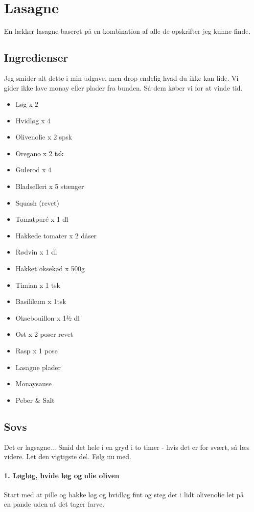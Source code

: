 \section{Lasagne}
En lækker lasagne baseret på en kombination af alle de opskrifter jeg kunne finde.

\subsection{Ingredienser}
Jeg smider alt dette i min udgave, men drop endelig hvad du ikke kan lide. Vi gider ikke lave monay eller plader fra bunden. Så dem køber vi for at vinde tid.

\begin{multicols}{2	}
	\begin{itemize}
		\item Løg x 2
		\item Hvidløg x 4
		\item Olivenolie x 2 spsk
		\item Oregano x 2 tsk
		\item Gulerod x 4
		\item Bladselleri x 5 stænger
		\item Squash (revet)
		\item Tomatpuré x 1 dl
		\item Hakkede tomater x 2 dåser
		\item Rødvin x 1 dl
		\item Hakket oksekød x 500g
		\item Timian x 1 tsk
		\item Basilikum x 1tsk
		\item Oksebouillon x 1½ dl
		\item Ost x 2 poser revet
		\item Rasp x 1 pose
		\item Lasagne plader
		\item Monaysause
		\item Peber \& Salt
	\end{itemize}
\end{multicols}

\subsection{Sovs}
Det er lagsagne... Smid det hele i en gryd i to timer - hvis det er for svært, så læs videre. Let den vigtigste del. Følg nu med.


\paragraph*{1. Løgløg, hvide løg og olie oliven}
Start med at pille og hakke løg og hvidløg fint og steg det i lidt olivenolie let på en pande uden at det tager farve.

